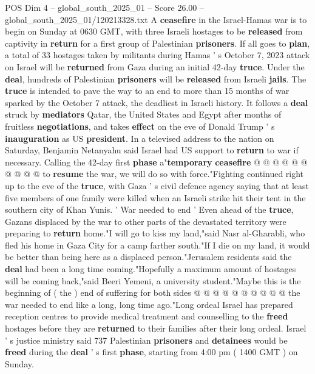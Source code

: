 \begin{textsample}{POS Dim 4 – global\_south\_2025\_01 – Score 26.00 – global\_south\_2025\_01/120213328.txt}  \label{ex:f4_pos_019}
A \textbf{ceasefire} in the Israel-Hamas war is to begin on Sunday at 0630 GMT, with three Israeli hostages to be \textbf{released} from captivity in \textbf{return} for a first group of Palestinian \textbf{prisoners}.
If all goes to \textbf{plan}, a total of 33 hostages taken by militants during Hamas ' s October 7, 2023 attack on Israel will be \textbf{returned} from Gaza during an initial 42-day \textbf{truce}.
Under the \textbf{deal}, hundreds of Palestinian \textbf{prisoners} will be \textbf{released} from Israeli \textbf{jails}.
The \textbf{truce} is intended to pave the way to an end to more than 15 months of war sparked by the October 7 attack, the deadliest in Israeli history.
It follows a \textbf{deal} struck by \textbf{mediators} Qatar, the United States and Egypt after months of fruitless \textbf{negotiations}, and takes \textbf{effect} on the eve of Donald Trump ' s \textbf{inauguration} as US \textbf{president}.
In a televised address to the nation on Saturday, Benjamin Netanyahu said Israel had US support to \textbf{return} to war if necessary.
Calling the 42-day first \textbf{phase} a"\textbf{temporary} \textbf{ceasefire} @ @ @ @ @ @ @ @ @ @ to \textbf{resume} the war, we will do so with force."Fighting continued right up to the eve of the \textbf{truce}, with Gaza ' s civil defence agency saying that at least five members of one family were killed when an Israeli strike hit their tent in the southern city of Khan Yunis. ' War needed to end ' Even ahead of the \textbf{truce}, Gazans displaced by the war to other parts of the devastated territory were preparing to \textbf{return} home."I will go to kiss my land,"said Nasr al-Gharabli, who fled his home in Gaza City for a camp farther south."If I die on my land, it would be better than being here as a displaced person."Jerusalem residents said the \textbf{deal} had been a long time coming."Hopefully a maximum amount of hostages will be coming back,"said Beeri Yemeni, a university student."Maybe this is the beginning of ( the ) end of suffering for both sides @ @ @ @ @ @ @ @ @ @ the war needed to end like a long, long time ago."Long ordeal Israel has prepared reception centres to provide medical treatment and counselling to the \textbf{freed} hostages before they are \textbf{returned} to their families after their long ordeal.
Israel ' s justice ministry said 737 Palestinian \textbf{prisoners} and \textbf{detainees} would be \textbf{freed} during the \textbf{deal} ' s first \textbf{phase}, starting from 4:00 pm ( 1400 GMT ) on Sunday.

\end{textsample}
